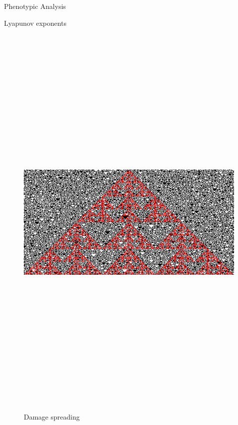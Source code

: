 \documentclass[12pt, letterpaper]{article}
\begin{document}
\begin{section}{Phenotypic Analysis}
\begin{subsection}{Lyapunov exponents}
\begin{figure}[H]
			\includegraphics[max width=200mm, max height=200mm, keepaspectratio]{SimDefects.png} 
		\caption{Damage spreading} 
		\end{figure} 
	\end{subsection} 
	\begin{table}[H] 
	\centering 
		\begin{tabular}{cc} 

\end{tabular}
\end{table}
\end{section}
\end{document}
